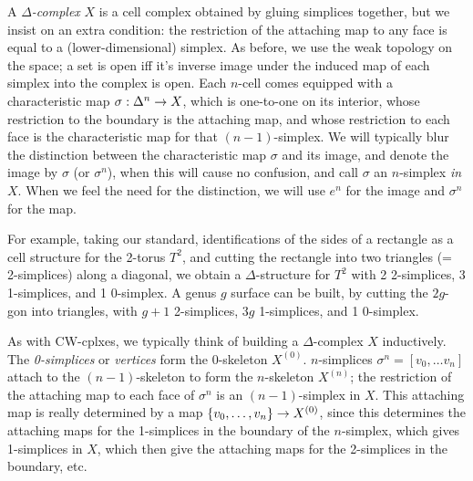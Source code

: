 \vfill
\eject

A {\it $\Delta$-complex} $X$ is a cell
complex obtained by gluing simplices together, but we insist on an extra
condition:
the restriction of the attaching map to any face is equal to a (lower-dimensional)
simplex. As before, we use the weak topology on the space; a set is open iff
it's inverse image under the induced map of each simplex into the complex is open.
Each $n$-cell comes equipped with a characteristic map
$\sigma:\Delta^n\rightarrow X$, which is one-to-one on its interior, whose restriction
to the boundary is the attaching map, and whose restriction to each face is the
characteristic map for that $(n-1)$-simplex. We will typically blur the 
distinction between the characteristic map $\sigma$ and its image, and denote the
image by $\sigma$ (or $\sigma^n$), when this will cause no confusion,
and call $\sigma$ an $n$-simplex {\it in} $X$. When we feel the need for the 
distinction, we will use $e^n$ for the image and $\sigma^n$ for the map.

\ssk

For example, taking our standard,
identifications of the sides of a rectangle as a cell structure for the 2-torus $T^2$,
and cutting the rectangle into two triangles (= 2-simplices) along a diagonal,
we obtain a $\Delta$-structure  for $T^2$ with 2 2-simplices, 3 1-simplices, and 1 0-simplex.
A genus $g$ surface can be built, by cutting the $2g$-gon into triangles, with
$g+1$ 2-simplices, $3g$ 1-simplices, and 1 0-simplex.

\bsk


As with CW-cplxes, we typically think of building a $\Delta$-complex $X$ inductively. 
The {\it 0-simplices} or {\it vertices} form the 0-skeleton 
$X^{(0)}$. $n$-simplices $\sigma^n = [v_0,\ldots v_n]$ attach 
to the $(n-1)$-skeleton
to form the $n$-skeleton $X^{(n)}$; the restriction
of the attaching map to each face of $\sigma^n$ is
an $(n-1)$-simplex in $X$. This attaching map is
really determined by a map $\{v_0,\ldots ,v_n\}\rightarrow X^{(0)}$, since this 
determines the attaching maps for the 1-simplices in the boundary of the
$n$-simplex, which 
gives 1-simplices in $X$, which then give the attaching maps for
the 2-simplices in the boundary, etc. 

\vfill
\eject

